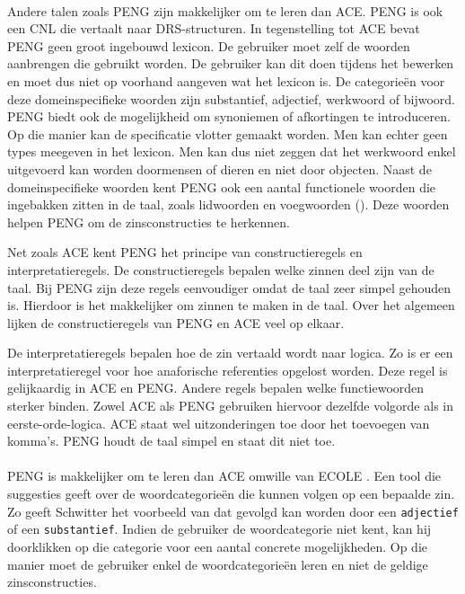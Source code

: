 \paragraph{} Andere talen zoals PENG \cite{Schwitter2002} zijn makkelijker om te leren dan ACE. PENG is ook een CNL die vertaalt naar DRS-structuren. In tegenstelling tot ACE bevat PENG geen groot ingebouwd lexicon. De gebruiker moet zelf de woorden aanbrengen die gebruikt worden. De gebruiker kan dit doen tijdens het bewerken en moet dus niet op voorhand aangeven wat het lexicon is. De categorie\"en voor deze domeinspecifieke woorden zijn substantief, adjectief, werkwoord of bijwoord. PENG biedt ook de mogelijkheid om synoniemen of afkortingen te introduceren. Op die manier kan de specificatie vlotter gemaakt worden. Men kan echter geen types meegeven in het lexicon. Men kan dus niet zeggen dat het werkwoord  enkel uitgevoerd kan worden doormensen of dieren en niet door objecten. Naast de domeinspecifieke woorden kent PENG ook een aantal functionele woorden die ingebakken zitten in de taal, zoals lidwoorden en voegwoorden (). Deze woorden helpen PENG om de zinsconstructies te herkennen.

Net zoals ACE kent PENG het principe van constructieregels en interpretatieregels. De constructieregels bepalen welke zinnen deel zijn van de taal. Bij PENG zijn deze regels eenvoudiger omdat de taal zeer simpel gehouden is. Hierdoor is het makkelijker om zinnen te maken in de taal. Over het algemeen lijken de constructieregels van PENG en ACE veel op elkaar.

De interpretatieregels bepalen hoe de zin vertaald wordt naar logica. Zo is er een interpretatieregel voor hoe anaforische referenties opgelost worden. Deze regel is gelijkaardig in ACE en PENG. Andere regels bepalen welke functiewoorden sterker binden. Zowel ACE als PENG gebruiken hiervoor dezelfde volgorde als in eerste-orde-logica. ACE staat wel uitzonderingen toe door het toevoegen van komma's. PENG houdt de taal simpel en staat dit niet toe.

\paragraph{} PENG is makkelijker om te leren dan ACE omwille van ECOLE \cite{Schwitter2003}. Een tool die suggesties geeft over de woordcategorie\"en die kunnen volgen op een bepaalde zin. Zo geeft Schwitter \cite{Schwitter2003} het voorbeeld van  dat gevolgd kan worden door een \texttt{adjectief} of een \texttt{substantief}. Indien de gebruiker de woordcategorie niet kent, kan hij doorklikken op die categorie voor een aantal concrete mogelijkheden. Op die manier moet de gebruiker enkel de woordcategorie\"en leren en niet de geldige zinsconstructies.

